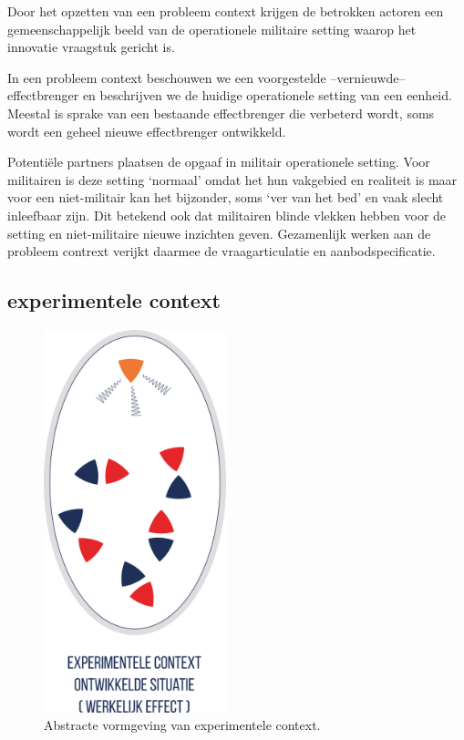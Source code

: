 \documentclass[
]{book}
\begin{document}
Door het opzetten van een probleem context krijgen de betrokken actoren een gemeenschappelijk beeld van de operationele militaire setting waarop het innovatie vraagstuk gericht is.

In een probleem context beschouwen we een voorgestelde --vernieuwde-- effectbrenger en beschrijven we de huidige operationele setting van een eenheid. Meestal is sprake van een bestaande effectbrenger die verbeterd wordt, soms wordt een geheel nieuwe effectbrenger ontwikkeld.

Potentiële partners plaatsen de opgaaf in militair operationele setting. Voor militairen is deze setting `normaal' omdat het hun vakgebied en realiteit is maar voor een niet-militair kan het bijzonder, soms `ver van het bed' en vaak slecht inleefbaar zijn. Dit betekend ook dat militairen blinde vlekken hebben voor de setting en niet-militaire nieuwe inzichten geven. Gezamenlijk werken aan de probleem contrext verijkt daarmee de vraagarticulatie en aanbodspecificatie.

\hypertarget{experimentele-context}{%
\subsection{experimentele context}\label{experimentele-context}}

\begin{figure}
\includegraphics[width=150pt]{data/images/20210324-MDI-eieren-beweging-2} \caption{Abstracte vormgeving van experimentele context.}\label{fig:eieren-in-beweging-2}
\end{figure}
\end{document}

